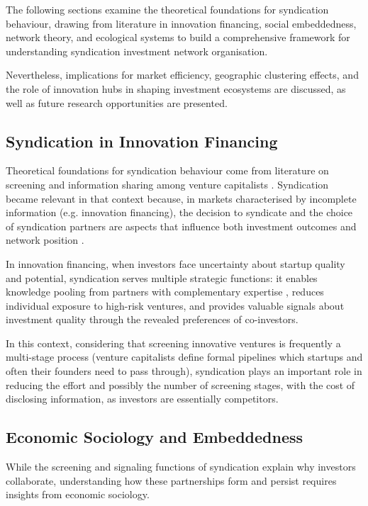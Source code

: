The following sections examine the theoretical foundations for syndication behaviour, drawing from literature in innovation financing, social embeddedness, network theory, and ecological systems to build a comprehensive framework for understanding syndication investment network organisation. 

Nevertheless, implications for market efficiency, geographic clustering effects, and the role of innovation hubs in shaping investment ecosystems are discussed, as well as future research opportunities are presented.

\subsection{Syndication in Innovation Financing}

Theoretical foundations for syndication behaviour come from literature on screening and information sharing among venture capitalists \cite{Casamatta2007}. Syndication became relevant in that context because, in markets characterised by incomplete information (e.g. innovation financing), the decision to syndicate and the choice of syndication partners are aspects that influence both investment outcomes and network position \cite{Casamatta2007}.

In innovation financing, when investors face uncertainty about startup quality and potential, syndication serves multiple strategic functions: it enables knowledge pooling from partners with complementary expertise \cite{Lerner1994}, reduces individual exposure to high-risk ventures, and provides valuable signals \cite{Spence1981} about investment quality through the revealed preferences of co-investors. 

In this context, considering that screening innovative ventures is frequently a multi-stage process (venture capitalists define formal pipelines which startups and often their founders need to pass through), syndication plays an important role in reducing the effort and possibly the number of screening stages, with the cost of disclosing information, as investors are essentially competitors.

\subsection{Economic Sociology and Embeddedness}

While the screening and signaling functions of syndication explain why investors collaborate, understanding how these partnerships form and persist requires insights from economic sociology. 

